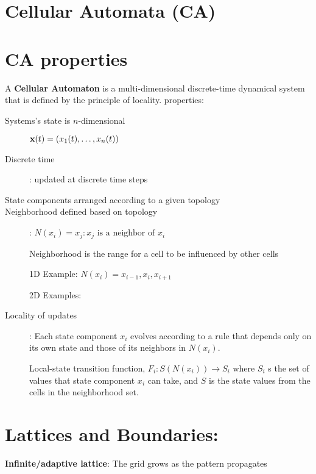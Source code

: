 \section*{Cellular Automata (CA)}

\section*{CA properties}

A \textbf{Cellular Automaton} is a multi-dimensional discrete-time dynamical
system that is defined by
the principle of locality. properties:

\begin{description}
    \item[Systems's state is $n$-dimensional] $\mathbf{x}(t) = (x_1(t), \dots, x_n(t))$
    \item[Discrete time]: updated at discrete time steps
    \item[State components arranged according to a given topology]
    \item[Neighborhood defined based on topology]: $N(x_i) =
    {x_j : x_j \text{ is a neighbor of }x_i}$

    Neighborhood is the range for a cell to be influenced by other cells

    1D Example: $N(x_i)={x_{i-1},x_i,x_{i+1}}$

    2D Examples:

    \item[Locality of updates]: Each state component $x_i$ evolves according to a rule
    that depends only on its own state and those of its neighbors in $N(x_i)$.

    Local-state transition function, $F_i: S(N(x_i)) \to S_i$ where $S_i$
    s the set of values that state component $x_i$ can take,
    and $S$ is the state values from the cells in the neighborhood set.
\end{description}

\section*{Lattices and Boundaries:}
\textbf{Infinite/adaptive lattice}: The grid grows as the pattern propagates

